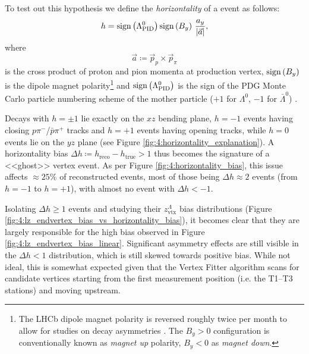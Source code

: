 To test out this hypothesis we define the \textit{horizontality} of a \lambdadecay event as follows:
\begin{equation}
h = \operatorname{sign}{\left(\Lambda^0_\text{PID}\right)} \operatorname{sign}{\left(B_y\right)}~\frac{a_y}{\lvert \vec{a} \rvert},
\label{eq:4:horizontality}
\end{equation}
where
\begin{equation}
\vec{a} \coloneqq \vec{p}_p \times \vec{p}_\pi 
\end{equation}
is the cross product of proton and pion momenta at production vertex, $\operatorname{sign}{\left(B_y\right)}$ is the dipole magnet polarity\footnote{The LHCb dipole magnet polarity is reversed roughly twice per month to allow for studies on decay asymmetries \cite{Vesterinen:1642153}. The $B_y > 0$ configuration is conventionally known as \textit{magnet up} polarity, $B_y < 0$ as \textit{magnet down}.}
and $\operatorname{sign}{\left(\Lambda^0_\text{PID}\right)}$ is the sign of the PDG Monte Carlo particle numbering scheme of the mother particle ($+1$ for $\Lambda^0$, $-1$ for $\bar{\Lambda}^0$) \cite{PDG}.

Decays with $h=\pm1$ lie exactly on the $xz$ bending plane, $h=-1$ events having closing $p\pi^-$/$\bar{p}\pi^+$ tracks and $h=+1$ events having opening tracks, while $h=0$ events lie on the $yz$ plane (see Figure \ref{fig:4:horizontality_explanation}).
A horizontality bias $\Delta h \coloneqq h_\text{reco} - h_\text{true} > 1$ thus becomes the signature of a <<ghost>> vertex \lambdadecay event.
As per Figure \ref{fig:4:horizontality_bias}, this issue affects $\approx 25\%$ of reconstructed \demonstratorshort events, most of those being $\Delta h \approx 2$ events (from $h=-1$ to $h=+1$), with almost no event with $\Delta h < -1$.

Isolating $\Delta h \geq 1$ events and studying their $z_\text{vtx}^\Lambda$ bias distributions (Figure \ref{fig:4:lz_endvertex_bias_vs_horizontality_bias}), it becomes clear that they are largely responsible for the high bias observed in Figure \ref{fig:4:lz_endvertex_bias_linear}.
Significant asymmetry effects are still visible in the $\Delta h < 1$ distribution, which is still skewed towards positive bias.
While not ideal, this is somewhat expected given that the Vertex Fitter algorithm scans for candidate vertices starting from the first measurement position (i.e. the T1--T3 stations) and moving upstream.

